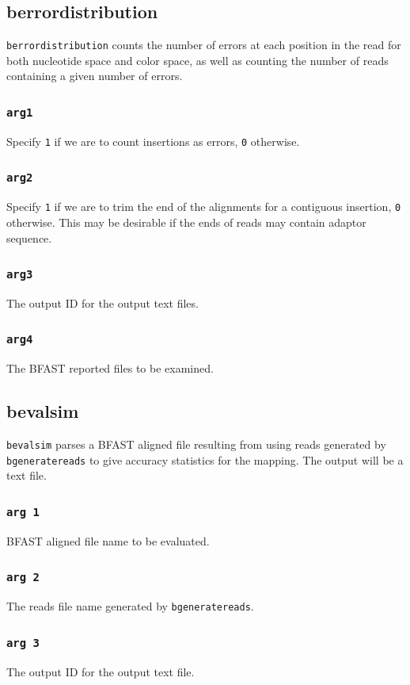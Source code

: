 \documentclass[a4paper,12pt]{book}
\newcommand{\TT}[1]{{\tt #1}} %
\newcommand{\BAF}{BFAST aligned file} %
\newcommand{\BRF}{BFAST reported file} %
\begin{document}
\subsection{berrordistribution}
\label{sec:berrordistribution}
\TT{berrordistribution} counts the number of errors at each position in the read for both nucleotide space and color space, as well as counting the number of reads containing a given number of errors.

\subsubsection{\TT{arg1}}
Specify \TT{1} if we are to count insertions as errors, \TT{0} otherwise.
\subsubsection{\TT{arg2}}
Specify \TT{1} if we are to trim the end of the alignments for a contiguous insertion, \TT{0} otherwise.
This may be desirable if the ends of reads may contain adaptor sequence. 
\subsubsection{\TT{arg3}}
The output ID for the output text files.
\subsubsection{\TT{arg4}}
The \BRF{s} to be examined.


\subsection{bevalsim}
\label{sec:bevalsim}
\TT{bevalsim} parses a \BAF{} resulting from using reads generated by \TT{bgeneratereads} to give accuracy statistics for the mapping.
The output will be a text file.

\subsubsection{\TT{arg 1}}
\BAF{} name to be evaluated.

\subsubsection{\TT{arg 2}}
The reads file name generated by \TT{bgeneratereads}.

\subsubsection{\TT{arg 3}}
The output ID for the output text file.
\end{document}
